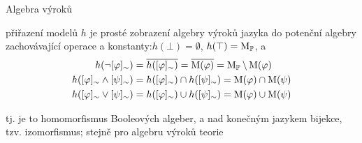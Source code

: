 \documentclass{beamer}
\begin{document}
\begin{frame}{Algebra výroků}


    \pause
    přiřazení modelů $h$ je prosté zobrazení algebry výroků jazyka do \alert{potenční algebry}  \pause\alert{zachovávající} operace a konstanty:\pause $h(\bot)=\emptyset$, $h(\top)=\operatorname{M}_\mathbb P$, a\pause
    {\small
    \begin{align*}
        h(\neg[\varphi]_\sim)&=\overline{h([\varphi]_\sim)}=\overline{\operatorname{M}(\varphi)}=\operatorname{M}_\mathbb P\setminus\operatorname{M}(\varphi)\\
        h([\varphi]_\sim\land[\psi]_\sim)&=h([\varphi]_\sim)\cap h([\psi]_\sim)=\operatorname{M}(\varphi)\cap\operatorname{M}(\psi)\\
        h([\varphi]_\sim\lor[\psi]_\sim)&=h([\varphi]_\sim)\cup h([\psi]_\sim)=\operatorname{M}(\varphi)\cup\operatorname{M}(\psi)
    \end{align*}
    }

    \vspace{-6pt}
    \pause
    tj. je to  \alert{homomorfismus} Booleových algeber, a nad konečným jazykem bijekce, tzv. \alert{izomorfismus}; \pause stejně pro algebru výroků teorie

    \pause

\end{frame}
\end{document}
